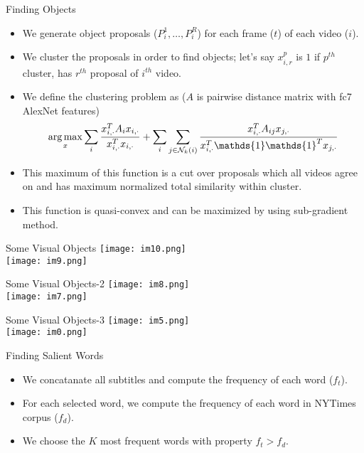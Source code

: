 \begin{frame}{Finding Objects}
  \begin{itemize}
    \item We generate object proposals ($P^1_{i},\ldots,P^R_{i}$) for each frame ($t$) of each video ($i$).
    \item We cluster the proposals in order to find objects; let's say $x^p_{i,r}$ is $1$ if $p^{th}$ cluster, has $r^{th}$ proposal of $i^{th}$ video.
    \item We define the clustering problem as ($A$ is pairwise distance matrix with fc7 AlexNet features)
    \[
    \argmax_{x}  \sum_{i} \frac{x_{i,\cdot}^TA_i x_{i,\cdot}}{x_{i,\cdot}^Tx_{i,\cdot}} +
   \sum_{i}\sum_{j \in \mathcal{N}_k(i)} \frac{x_{i,\cdot}^TA_{ij}x_{j,\cdot}}{x_{i,\cdot}^T \mathds{1} \mathds{1}^Tx_{j,\cdot}}
    \]
    \item This maximum of this function is a cut over proposals which all videos agree on and has maximum normalized total similarity within cluster.
    \item This function is quasi-convex and can be maximized by using sub-gradient method.
  \end{itemize}
\end{frame}

\begin{frame}{Some Visual Objects}
  \texttt{[image: im10.png]}
  \\
\texttt{[image: im9.png]}
\end{frame}

\begin{frame}{Some Visual Objects-2}
  \texttt{[image: im8.png]}
  \\
\texttt{[image: im7.png]}
\end{frame}

\begin{frame}{Some Visual Objects-3}
  \texttt{[image: im5.png]}
  \\
\texttt{[image: im0.png]}
\end{frame}

\begin{frame}{Finding Salient Words}
  \begin{itemize}
    \item We concatanate all subtitles and compute the frequency of each word ($f_t$).
    \item For each selected word, we compute the frequency of each word in NYTimes corpus ($f_d$).
    \item We choose the $K$ most frequent words with property $f_t>f_d$.
  \end{itemize}
\end{frame}


